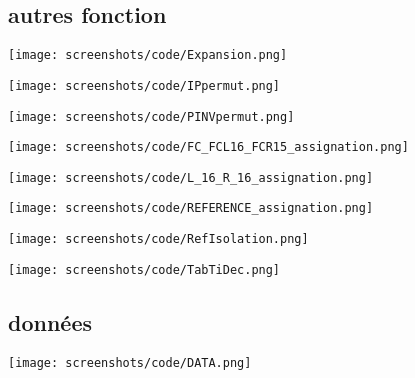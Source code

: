 \documentclass[a4paper,11pt]{article}
\begin{document}
		\subsection{autres fonction}
			\begin{center}\texttt{[image: screenshots/code/Expansion.png]}\end{center} 
			\begin{center}\texttt{[image: screenshots/code/IPpermut.png]}\end{center}
			\begin{center}\texttt{[image: screenshots/code/PINVpermut.png]}\end{center} 
			\begin{center}\texttt{[image: screenshots/code/FC\_FCL16\_FCR15\_assignation.png]}\end{center} 
			\begin{center}\texttt{[image: screenshots/code/L\_16\_R\_16\_assignation.png]}\end{center} 
			\begin{center}\texttt{[image: screenshots/code/REFERENCE\_assignation.png]}\end{center} 
			\begin{center}\texttt{[image: screenshots/code/RefIsolation.png]}\end{center} 
			\begin{center}\texttt{[image: screenshots/code/TabTiDec.png]}\end{center} 
		\subsection{données}
			\begin{center}\texttt{[image: screenshots/code/DATA.png]}\end{center} 
\end{document}
